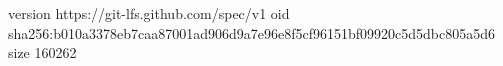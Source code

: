 version https://git-lfs.github.com/spec/v1
oid sha256:b010a3378eb7caa87001ad906d9a7e96e8f5cf96151bf09920c5d5dbc805a5d6
size 160262
